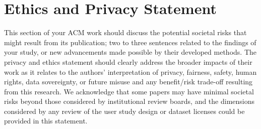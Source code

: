 \section*{Ethics and Privacy Statement}

This section of your ACM work should discuss the potential societal
risks that might result from its publication; two to three sentences
related to the findings of your study, or new advancements made
possible by their developed methods. The privacy and ethics statement
should clearly address the broader impacts of their work as it relates
to the authors' interpretation of privacy, fairness, safety, human
rights, data sovereignty, or future misuse and any benefit/risk
trade-off resulting from this research. We acknowledge that some
papers may have minimal societal risks beyond those considered by
institutional review boards, and the dimensions considered by any
review of the user study design or dataset licenses could be provided
in this statement.

